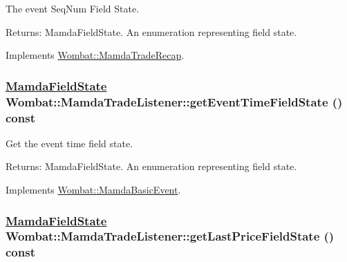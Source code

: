 The event Seq\-Num Field State. 

\begin{Desc}
\item[Returns:]Mamda\-Field\-State. An enumeration representing field state. \end{Desc}


Implements \hyperlink{classWombat_1_1MamdaTradeRecap_13ffda2f1178cc9c6297b3624d0b9912}{Wombat::Mamda\-Trade\-Recap}.\hypertarget{classWombat_1_1MamdaTradeListener_db4c54a4b13c5cff7a25f15d524fbcd8}{
\subsubsection[getEventTimeFieldState]{\setlength{\rightskip}{0pt plus 5cm}\hyperlink{namespaceWombat_93aac974f2ab713554fd12a1fa3b7d2a}{Mamda\-Field\-State} Wombat::Mamda\-Trade\-Listener::get\-Event\-Time\-Field\-State () const}}
\label{classWombat_1_1MamdaTradeListener_db4c54a4b13c5cff7a25f15d524fbcd8}


Get the event time field state. 

\begin{Desc}
\item[Returns:]Mamda\-Field\-State. An enumeration representing field state. \end{Desc}


Implements \hyperlink{classWombat_1_1MamdaBasicEvent_ff3932065e16e660fb6cd9285b46f7d0}{Wombat::Mamda\-Basic\-Event}.\hypertarget{classWombat_1_1MamdaTradeListener_1374642c578867d0b51dff83e5b2a99f}{
\subsubsection[getLastPriceFieldState]{\setlength{\rightskip}{0pt plus 5cm}\hyperlink{namespaceWombat_93aac974f2ab713554fd12a1fa3b7d2a}{Mamda\-Field\-State} Wombat::Mamda\-Trade\-Listener::get\-Last\-Price\-Field\-State () const}}
\label{classWombat_1_1MamdaTradeListener_1374642c578867d0b51dff83e5b2a99f}



